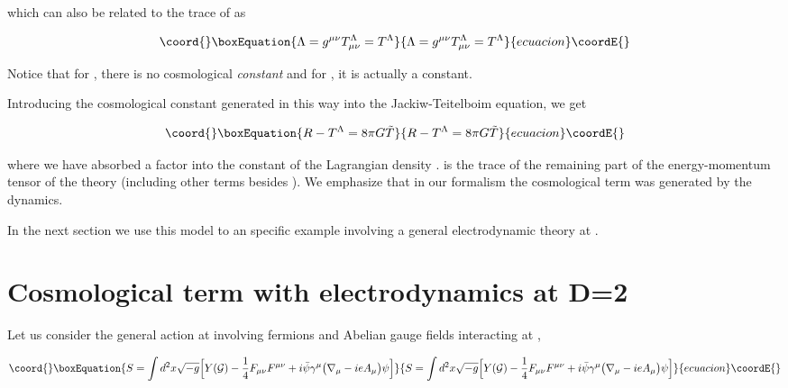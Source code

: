 \documentclass[a4paper,twocolumn,prd,groupedaddress,nofootinbib,showpacs]
{revtex4}
\begin{document}
\noindent
which can also be related to the trace of \coordHE{} as

\begin{equation}\coord{}\boxEquation{
\Lambda=g^{\mu\nu}T^\Lambda_{\mu\nu}=T^\Lambda
\label{2.8}
}{
\Lambda=g^{\mu\nu}T^\Lambda_{\mu\nu}=T^\Lambda
}{ecuacion}\coordE{}\end{equation}

\noindent
Notice that for \coordHE{}, there is no cosmological {\it constant} and for
\coordHE{}, it is actually a constant.

\medskip
Introducing the cosmological constant generated in this way into the
Jackiw-Teitelboim equation, we get

\begin{equation}\coord{}\boxEquation{
R-T^\Lambda=8\pi G\tilde T
\label{2.9}
}{
R-T^\Lambda=8\pi G\tilde T
}{ecuacion}\coordE{}\end{equation}

\noindent
where we have absorbed a factor \coordHE{} into the constant \coordHE{} of the
Lagrangian density \coordHE{}. \coordHE{} is the trace of the remaining part
of the energy-momentum tensor of the theory (including other terms
besides \coordHE{}). We emphasize that in our formalism the
cosmological term was generated by the dynamics.

\medskip
In the next section we use this model to an specific example
involving a general electrodynamic theory at \coordHE{}.

\section{Cosmological term with electrodynamics at D=2}
\renewcommand{\theequation}{3.\arabic{equation}}
\setcounter{equation}{0}

Let us consider the general action at involving fermions and Abelian
gauge fields interacting at \coordHE{},

\begin{equation}\coord{}\boxEquation{
S=\int d^2x\sqrt{-g}\Bigl[Y({\cal G})
-\frac{1}{4}F_{\mu\nu}F^{\mu\nu}
+i\bar\psi\gamma^\mu\bigl(\nabla_\mu-ieA_\mu\bigr)\psi\Bigr]
\label{3.1}
}{
S=\int d^2x\sqrt{-g}\Bigl[Y({\cal G})
-\frac{1}{4}F_{\mu\nu}F^{\mu\nu}
+i\bar\psi\gamma^\mu\bigl(\nabla_\mu-ieA_\mu\bigr)\psi\Bigr]
}{ecuacion}\coordE{}\end{equation}
\end{document}
